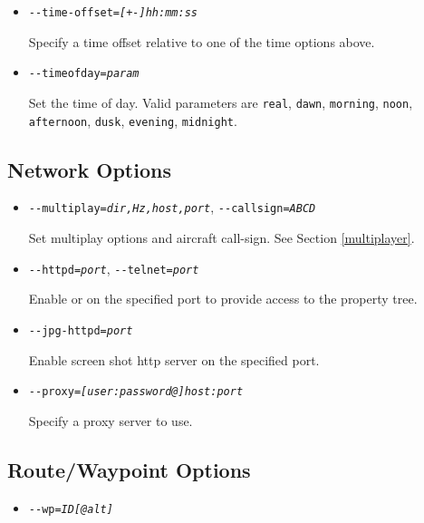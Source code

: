 {\begin{itemize}
\item{\texttt{-$ $-time-offset={\it [+-]hh:mm:ss}}}

Specify a time offset relative to one of the time options above.

\item{\texttt{-$ $-timeofday={\it param}}}

Set the time of day. Valid parameters are \texttt{real}, \texttt{dawn}, \texttt{morning},
\texttt{noon}, \texttt{afternoon}, \texttt{dusk}, \texttt{evening}, \texttt{midnight}.

\end{itemize}

\subsection{Network Options}
\begin{itemize}
\item{\texttt{-$ $-multiplay={\it dir,Hz,host,port}}, \texttt{-$ $-callsign={\it ABCD}}}

Set multiplay options and aircraft call-sign. See Section \ref{multiplayer}.

\item{\texttt{-$ $-httpd={\it port}}, \texttt{-$ $-telnet={\it port}}}

Enable  or  on the specified port to provide
access to the property tree.

\item{\texttt{-$ $-jpg-httpd={\it port}}}

Enable screen shot http server on the specified port.

\item{\texttt{-$ $-proxy={\it [user:password@]host:port}}}

Specify a proxy server to use.

\end{itemize}
\subsection{Route/Waypoint Options}
\begin{itemize}
\item{\texttt{-$ $-wp={\it ID[@alt]}}}


\end{itemize}}
